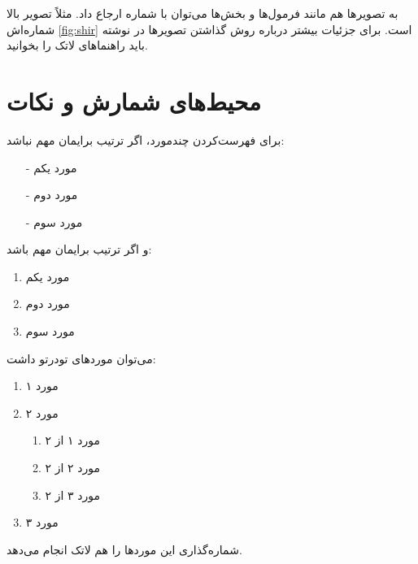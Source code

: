 به تصویرها هم مانند فرمول‌ها و بخش‌ها می‌توان با شماره ارجاع داد. مثلاً تصویر بالا شماره‌اش \ref{fig:shir} است. برای جزئیات بیشتر درباره روش گذاشتن تصویرها در نوشته باید راهنماهای لاتک را بخوانید.

\section{محیط‌های شمارش و نکات}
برای فهرست‌کردن چندمورد، اگر ترتیب برایمان مهم نباشد:
\begin{itemize}
	\item[-] مورد یکم
	\item[-] مورد دوم
	\item[-] مورد سوم
\end{itemize}
و اگر ترتیب برایمان مهم باشد:
\begin{enumerate}
	\item مورد یکم
	\item مورد دوم
	\item مورد سوم
\end{enumerate}
می‌توان موردهای تودرتو داشت:
\begin{enumerate}
	\item مورد ۱
	\item مورد ۲
	\begin{enumerate}
		\item مورد ۱ از ۲
		\item مورد ۲ از ۲
		\item مورد ۳ از ۲
	\end{enumerate}
	\item مورد ۳
\end{enumerate}
شماره‌گذاری این موردها را هم لاتک انجام می‌دهد.
